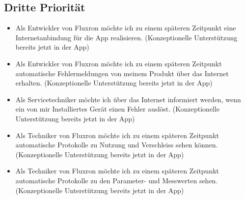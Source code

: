 \subsection{Dritte Priorität}
\label{subsec:Dritte Priorität}

\begin{itemize}
\item Als Entwickler von Fluxron möchte ich zu einem späteren Zeitpunkt eine Internetanbindung für die App realisieren. (Konzeptionelle Unterstützung bereits jetzt in der App)
\item Als Entwickler von Fluxron möchte ich zu einem späteren Zeitpunkt automatische Fehlermeldungen von meinem Produkt über das Internet erhalten. (Konzeptionelle Unterstützung bereits jetzt in der App)
\item Als Servicetechniker möchte ich über das Internet informiert werden, wenn ein von mir Installiertes Gerät einen Fehler auslöst. (Konzeptionelle Unterstützung bereits jetzt in der App)
\item Als Techniker von Fluxron möchte ich zu einem späteren Zeitpunkt automatische Protokolle zu Nutzung und Verschleiss sehen können. (Konzeptionelle Unterstützung bereits jetzt in der App)
\item Als Techniker von Fluxron möchte ich zu einem späteren Zeitpunkt automatische Protokolle zu den Parameter- und Messwerten sehen. (Konzeptionelle Unterstützung bereits jetzt in der App)
\end{itemize}
